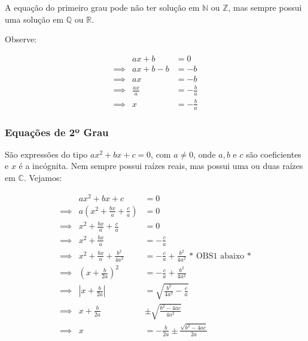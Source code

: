 \documentclass[oneside,a4paper,12pt]{article}
\begin{document}
A equação do primeiro grau pode não ter solução em $\mathbb{N}$ ou $\mathbb{Z}$, mas sempre possui uma solução em $\mathbb{Q}$ ou $\mathbb{R}$.

Observe:

\begin{eqnarray*}
	&  ax + b & = 0 \\
	\implies & ax + b - b & = -b \\
	\implies & ax & = -b \\
	\implies & \displaystyle \frac{ax}{a} & = \displaystyle - \frac{b}{a}\\
	\implies & x & = \displaystyle - \frac{b}{a}
\end{eqnarray*}

\subsubsection{Equações de 2º Grau}

São expressões do tipo $ax^{2} + bx + c = 0$, com $a \neq 0$, onde $a,b$ e $c$ são coeficientes e $x$ é a incógnita. Nem sempre possui raízes reais, mas possui uma ou duas raízes em $\mathbb{C}$. Vejamos:

\begin{eqnarray*}
	&  ax^2 + bx + c & = 0 \\
	\implies & a\left( x^2 + \displaystyle \frac{bx}{a} + \displaystyle \frac{c}{a} \right) & = 0 \\
	\implies & x^2 + \displaystyle \frac{bx}{a} + \displaystyle \frac{c}{a} & = 0 \\
	\implies & x^2 + \displaystyle \frac{bx}{a} & = - \displaystyle \frac{c}{a}\\
	\implies & x^2 + \displaystyle \frac{bx}{a} + \displaystyle \frac{b^2}{4a^2} & = \displaystyle - \frac{c}{a} + \displaystyle \frac{b^2}{4a^2} \text{ * OBS1 abaixo *} \\
	\implies & \left( x + \displaystyle \frac{b}{2a} \right)^2 & = \displaystyle - \frac{c}{a} + \displaystyle \frac{b^2}{4a^2} \\
	\implies & \left| x + \displaystyle \frac{b}{2a} \right| & = \displaystyle \sqrt{\displaystyle \frac{b^2}{4a^2} - \displaystyle \frac{c}{a}} \\
	\implies & x + \displaystyle \frac{b}{2a} & \pm \displaystyle \sqrt{\displaystyle \frac{b^2 - 4ac}{4a^2}}\\
	\implies & x & = - \displaystyle \frac{b}{2a} \pm \displaystyle \frac{\displaystyle \sqrt{b^2 - 4ac}}{2a} \\
\end{eqnarray*}
\end{document}
